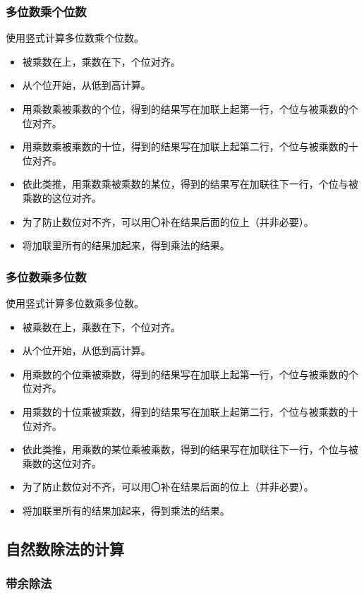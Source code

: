 \documentclass[12pt,UTF8]{ctexart}
\begin{document}
\subsubsection{多位数乘个位数}

使用竖式计算多位数乘个位数。

\begin{itemize}
\item 被乘数在上，乘数在下，个位对齐。
\item 从个位开始，从低到高计算。
\item 用乘数乘被乘数的个位，得到的结果写在加联上起第一行，个位与被乘数的个位对齐。
\item 用乘数乘被乘数的十位，得到的结果写在加联上起第二行，个位与被乘数的十位对齐。
\item 依此类推，用乘数乘被乘数的某位，得到的结果写在加联往下一行，个位与被乘数的这位对齐。
\item 为了防止数位对不齐，可以用〇补在结果后面的位上（并非必要）。
\item 将加联里所有的结果加起来，得到乘法的结果。
\end{itemize}

\subsubsection{多位数乘多位数}

使用竖式计算多位数乘多位数。

\begin{itemize}
\item 被乘数在上，乘数在下，个位对齐。
\item 从个位开始，从低到高计算。
\item 用乘数的个位乘被乘数，得到的结果写在加联上起第一行，个位与被乘数的个位对齐。
\item 用乘数的十位乘被乘数，得到的结果写在加联上起第二行，个位与被乘数的十位对齐。
\item 依此类推，用乘数的某位乘被乘数，得到的结果写在加联往下一行，个位与被乘数的这位对齐。
\item 为了防止数位对不齐，可以用〇补在结果后面的位上（并非必要）。
\item 将加联里所有的结果加起来，得到乘法的结果。
\end{itemize}

\subsection{自然数除法的计算}

\subsubsection{带余除法}
\end{document}
